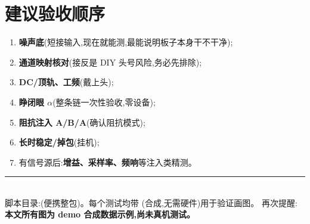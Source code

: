 \documentclass[11pt]{ctexart}
\begin{document}
\section{建议验收顺序}
\begin{enumerate}
\item \textbf{噪声底}(短接输入,现在就能测,最能说明板子本身干不干净);
\item \textbf{通道映射核对}(接反是 DIY 头号风险,务必先排除);
\item \textbf{DC/顶轨、工频}(戴上头);
\item \textbf{睁闭眼 $\alpha$}(整条链一次性验收,零设备);
\item \textbf{阻抗注入 A/B/A}(确认阻抗模式);
\item \textbf{长时稳定/掉包}(挂机);
\item 有信号源后:\textbf{增益、采样率、频响}等注入类精测。
\end{enumerate}

\vspace{0.6em}\noindent\rule{\linewidth}{0.4pt}\\[2pt]
{\small 脚本目录:(便携整包)。每个测试均带 (合成,无需硬件)用于验证画图。
再次提醒:\textbf{本文所有图为 demo 合成数据示例,尚未真机测试。}}
\end{document}
